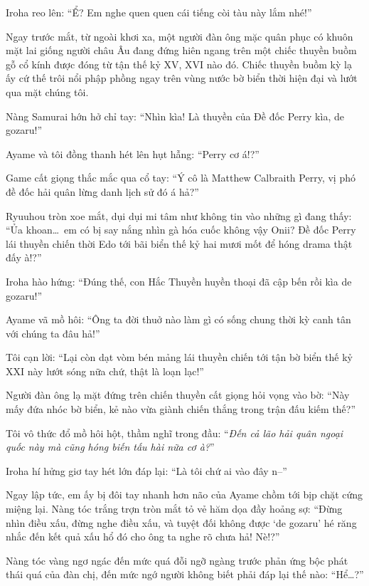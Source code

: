 \documentclass[../main.tex]{subfiles}
\begin{document}
Iroha reo lên: ``Ể? Em nghe quen quen cái tiếng còi tàu này lắm nhé!''

Ngay trước mắt, từ ngoài khơi xa, một người đàn ông mặc quân phục có khuôn mặt lai giống người châu Âu đang đứng hiên ngang trên một chiếc thuyền buồm gỗ cổ kính được đóng từ tận thế kỷ XV, XVI nào đó. Chiếc thuyền buồm kỳ lạ ấy cứ thế trôi nổi phập phồng ngay trên vùng nước bờ biển thời hiện đại và lướt qua mặt chúng tôi.


Nàng Samurai hớn hở chỉ tay: ``Nhìn kìa! Là thuyền của Đề đốc Perry kìa, de gozaru!''

Ayame và tôi đồng thanh hét lên hụt hẫng: ``Perry cơ á!?''

Game cất giọng thắc mắc qua cổ tay: ``Ý cô là Matthew Calbraith Perry, vị phó đề đốc hải quân lừng danh lịch sử đó á hả?''

Ryuuhou tròn xoe mắt, dụi dụi mi tâm như không tin vào những gì đang thấy: ``Ủa khoan\dots\ em có bị say nắng nhìn gà hóa cuốc không vậy Onii? Đề đốc Perry lái thuyền chiến thời Edo tới bãi biển thế kỷ hai mươi mốt để hóng drama thật đấy à!?''

Iroha hào hứng: ``Đúng thế, con Hắc Thuyền huyền thoại đã cập bến rồi kìa de gozaru!''

Ayame vã mồ hôi: ``Ông ta đời thuở nào làm gì có sống chung thời kỳ canh tân với chúng ta đâu hả!''

Tôi cạn lời: ``Lại còn dạt vòm bén mảng lái thuyền chiến tới tận bờ biển thế kỷ XXI này lướt sóng nữa chứ, thật là loạn lạc!''

Người đàn ông lạ mặt đứng trên chiến thuyền cất giọng hỏi vọng vào bờ: ``Này mấy đứa nhóc bờ biển, kẻ nào vừa giành chiến thắng trong trận đấu kiếm thế?''

Tôi vô thức đổ mồ hôi hột, thầm nghĩ trong đầu: ``\textit{Đến cả lão hải quân ngoại quốc này mà cũng hóng biến tấu hài nữa cơ à?}''

Iroha hí hửng giơ tay hét lớn đáp lại: ``Là tôi chứ ai vào đây n--''

Ngay lập tức, em ấy bị đôi tay nhanh hơn não của Ayame chồm tới bịp chặt cứng miệng lại. Nàng tóc trắng trợn tròn mắt tỏ vẻ hăm dọa đầy hoảng sợ: ``Đừng nhìn điều xấu, đừng nghe điều xấu, và tuyệt đối không được `de gozaru' hé răng nhắc đến kết quả xấu hổ đó cho ông ta nghe rõ chưa hả! Nè!?''


Nàng tóc vàng ngơ ngác đến mức quá đỗi ngỡ ngàng trước phản ứng bộc phát thái quá của đàn chị, đến mức ngớ người không biết phải đáp lại thế nào: ``Hể\dots?''
\end{document}
